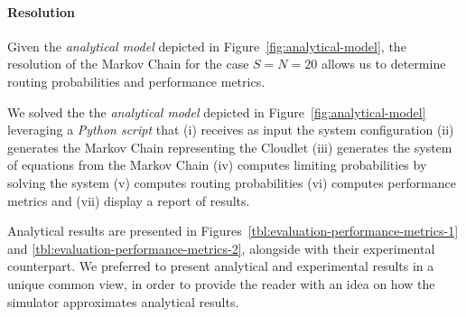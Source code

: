 \paragraph{Resolution}
Given the \textit{analytical model} depicted in Figure~\ref{fig:analytical-model}, the resolution of the Markov Chain for the case $S=N=20$ allows us to determine routing probabilities and performance metrics.

We solved the the \textit{analytical model} depicted in Figure~\ref{fig:analytical-model} leveraging a \textit{Python script} that 
(i) receives as input the system configuration
(ii) generates the Markov Chain representing the Cloudlet
(iii) generates the system of equations from the Markov Chain
(iv) computes limiting probabilities by solving the system
(v) computes routing probabilities
(vi) computes performance metrics and
(vii) display a report of results.

Analytical results are presented in Figures~\ref{tbl:evaluation-performance-metrics-1} and \ref{tbl:evaluation-performance-metrics-2}, alongside with their experimental counterpart.
%
We preferred to present analytical and experimental results in a unique common view, in order to provide the reader with an idea on how the simulator approximates analytical results.